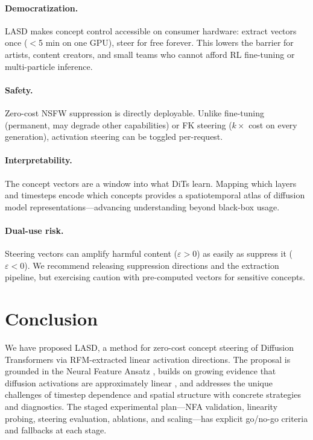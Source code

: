 \documentclass[11pt]{article}
\begin{document}
\paragraph{Democratization.}
LASD makes concept control accessible on consumer hardware: extract vectors once ($<$5 min on one GPU), steer for free forever.
This lowers the barrier for artists, content creators, and small teams who cannot afford RL fine-tuning or multi-particle inference.

\paragraph{Safety.}
Zero-cost NSFW suppression is directly deployable.
Unlike fine-tuning (permanent, may degrade other capabilities) or FK steering ($k\times$ cost on every generation), activation steering can be toggled per-request.

\paragraph{Interpretability.}
The concept vectors are a window into what DiTs learn.
Mapping which layers and timesteps encode which concepts provides a spatiotemporal atlas of diffusion model representations---advancing understanding beyond black-box usage.

\paragraph{Dual-use risk.}
Steering vectors can amplify harmful content ($\varepsilon > 0$) as easily as suppress it ($\varepsilon < 0$).
We recommend releasing suppression directions and the extraction pipeline, but exercising caution with pre-computed vectors for sensitive concepts.

\section{Conclusion}

We have proposed LASD, a method for zero-cost concept steering of Diffusion Transformers via RFM-extracted linear activation directions.
The proposal is grounded in the Neural Feature Ansatz \citep{radhakrishnan2024mechanism}, builds on growing evidence that diffusion activations are approximately linear \citep{kwon2023diffusion,li2024selfdiscovering,conceptattention2025,park2024dit}, and addresses the unique challenges of timestep dependence and spatial structure with concrete strategies and diagnostics.
The staged experimental plan---NFA validation, linearity probing, steering evaluation, ablations, and scaling---has explicit go/no-go criteria and fallbacks at each stage.
\end{document}
